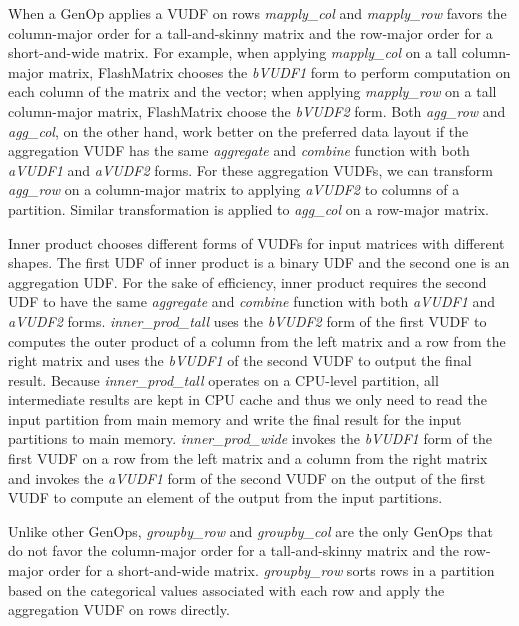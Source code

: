 When a GenOp applies a VUDF on rows
\textit{mapply\_col} and \textit{mapply\_row} favors
the column-major order for a tall-and-skinny matrix and the row-major order
for a short-and-wide matrix. For example, when applying \textit{mapply\_col}
on a tall column-major matrix, FlashMatrix chooses the \textit{bVUDF1} form to
perform computation on each column of the matrix and the vector; when applying
\textit{mapply\_row} on a tall column-major matrix, FlashMatrix choose
the \textit{bVUDF2} form.
Both \textit{agg\_row}
and \textit{agg\_col}, on the other hand, work better on the preferred data
layout if the aggregation VUDF has the same \textit{aggregate} and \textit{combine}
function with both \textit{aVUDF1} and \textit{aVUDF2} forms. For these aggregation
VUDFs, we can transform \textit{agg\_row} on a column-major matrix to applying
\textit{aVUDF2} to columns of a partition. Similar transformation is applied
to \textit{agg\_col} on a row-major matrix.

Inner product chooses different forms of VUDFs for input matrices with different
shapes. The first UDF of inner product is a binary UDF and the second one is an
aggregation UDF. For the sake of efficiency, inner product requires the second
UDF to have the same \textit{aggregate} and \textit{combine} function with both
\textit{aVUDF1} and \textit{aVUDF2} forms.
\textit{inner\_prod\_tall} uses the \textit{bVUDF2} form of the first
VUDF to computes the outer product of a column from the left matrix and a row
from the right matrix and uses the \textit{bVUDF1} of the second VUDF to output
the final result. Because \textit{inner\_prod\_tall} operates on a CPU-level
partition, all intermediate results are kept in CPU cache and thus we only need
to read the input partition from main memory and write the final result for
the input partitions to main memory. \textit{inner\_prod\_wide} invokes the
\textit{bVUDF1} form of the first VUDF on a row from the left matrix and a column
from the right matrix and invokes the \textit{aVUDF1} form of the second VUDF
on the output of the first VUDF to compute an element of the output from
the input partitions.

Unlike other GenOps, \textit{groupby\_row} and \textit{groupby\_col} are the only
GenOps that do not favor the column-major order for a tall-and-skinny matrix and
the row-major order for a short-and-wide matrix. \textit{groupby\_row} sorts
rows in a partition based on the categorical values associated with each row
and apply the aggregation VUDF on rows directly.

